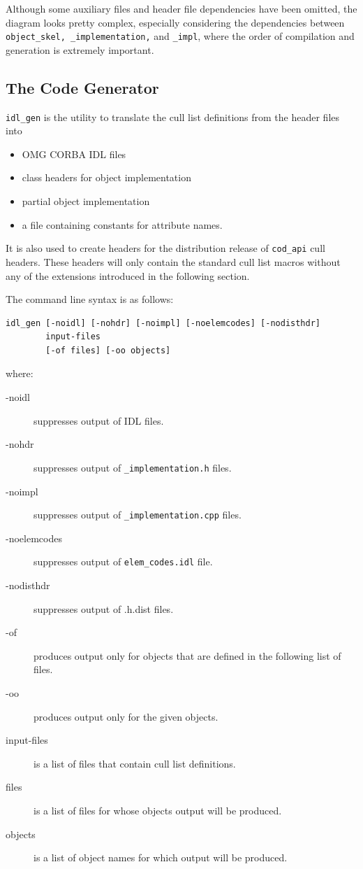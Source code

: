 Although some auxiliary files and header file dependencies have been
omitted, the diagram looks pretty complex, especially considering the
dependencies between \texttt{object\_skel, \_implementation,} and
\texttt{\_impl}, where the order of compilation and generation is extremely
important.

\subsection{\label{s_prog_idlgen}The Code Generator}
{\tt idl\_gen} is the utility to translate the cull list definitions from the
header files into 
\begin{itemize}
\item OMG CORBA IDL files
\item class headers for object implementation
\item partial object implementation
\item a file containing constants for attribute names.
\end{itemize}
It is also used to create headers for the
distribution release of {\tt cod\_api} cull headers. These headers will only
contain the standard cull list macros without any of the extensions
introduced in the following section. 

The command line syntax is as follows:

\begin{Verbatim}[fontsize=\small, frame=single]
idl_gen [-noidl] [-nohdr] [-noimpl] [-noelemcodes] [-nodisthdr] 
        input-files
        [-of files] [-oo objects]
\end{Verbatim}

where:
\begin{description}
\item[-noidl]      suppresses output of IDL files.
\item[-nohdr]      suppresses output of \texttt{\_implementation.h} files.
\item[-noimpl]     suppresses output of \texttt{\_implementation.cpp} files.
\item[-noelemcodes]suppresses output of \texttt{elem\_codes.idl} file.
\item[-nodisthdr]  suppresses output of .h.dist files.
\item[-of]         produces output only for objects that are defined in the
             following list of files.
\item[-oo]         produces output only for the given objects.
\item[input-files] is a list of files that contain cull list definitions.
\item[files]       is a list of files for whose objects output will be produced.
\item[objects]     is a list of object names for which output will be produced.
\end{description}

